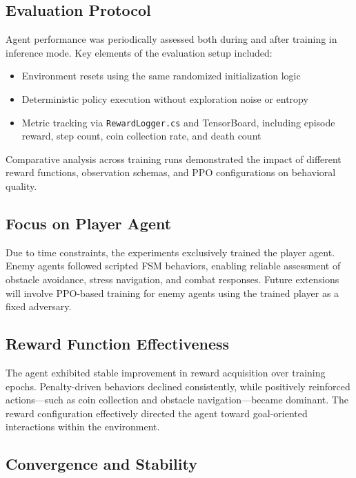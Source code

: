 \documentclass[12pt,oneside,openright,a4paper]{cpe-english-project}
\begin{document}
\subsection{Evaluation Protocol}

Agent performance was periodically assessed both during and after training in inference mode. Key elements of the evaluation setup included:

\begin{itemize}
\item Environment resets using the same randomized initialization logic
\item Deterministic policy execution without exploration noise or entropy
\item Metric tracking via \texttt{RewardLogger.cs} and TensorBoard, including episode reward, step count, coin collection rate, and death count
\end{itemize}

Comparative analysis across training runs demonstrated the impact of different reward functions, observation schemas, and PPO configurations on behavioral quality.

\subsection{Focus on Player Agent}

Due to time constraints, the experiments exclusively trained the player agent. Enemy agents followed scripted FSM behaviors, enabling reliable assessment of obstacle avoidance, stress navigation, and combat responses. Future extensions will involve PPO-based training for enemy agents using the trained player as a fixed adversary.

\subsection{Reward Function Effectiveness}

The agent exhibited stable improvement in reward acquisition over training epochs. Penalty-driven behaviors declined consistently, while positively reinforced actions—such as coin collection and obstacle navigation—became dominant. The reward configuration effectively directed the agent toward goal-oriented interactions within the environment.

\subsection{Convergence and Stability}
\end{document}
